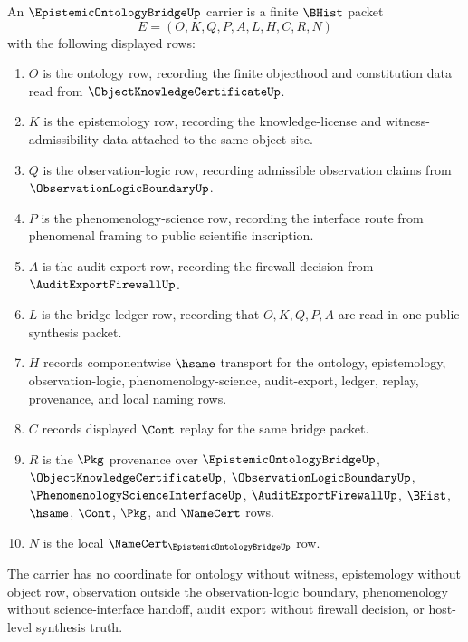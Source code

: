 \begin{definition}
\label{def:epistemic-ontology-bridge-carrier}
An $\EpistemicOntologyBridgeUp$ carrier is a finite $\BHist$ packet
$$
E=(O,K,Q,P,A,L,H,C,R,N)
$$
with the following displayed rows:
\begin{enumerate}
\item $O$ is the ontology row, recording the finite objecthood and constitution data read from $\ObjectKnowledgeCertificateUp$.
\item $K$ is the epistemology row, recording the knowledge-license and witness-admissibility data attached to the same object site.
\item $Q$ is the observation-logic row, recording admissible observation claims from $\ObservationLogicBoundaryUp$.
\item $P$ is the phenomenology-science row, recording the interface route from phenomenal framing to public scientific inscription.
\item $A$ is the audit-export row, recording the firewall decision from $\AuditExportFirewallUp$.
\item $L$ is the bridge ledger row, recording that $O,K,Q,P,A$ are read in one public synthesis packet.
\item $H$ records componentwise $\hsame$ transport for the ontology, epistemology, observation-logic, phenomenology-science, audit-export, ledger, replay, provenance, and local naming rows.
\item $C$ records displayed $\Cont$ replay for the same bridge packet.
\item $R$ is the $\Pkg$ provenance over $\EpistemicOntologyBridgeUp$, $\ObjectKnowledgeCertificateUp$, $\ObservationLogicBoundaryUp$, $\PhenomenologyScienceInterfaceUp$, $\AuditExportFirewallUp$, $\BHist$, $\hsame$, $\Cont$, $\Pkg$, and $\NameCert$ rows.
\item $N$ is the local $\NameCert_{\EpistemicOntologyBridgeUp}$ row.
\end{enumerate}
The carrier has no coordinate for ontology without witness, epistemology without object row, observation outside the observation-logic boundary, phenomenology without science-interface handoff, audit export without firewall decision, or host-level synthesis truth.
\end{definition}

